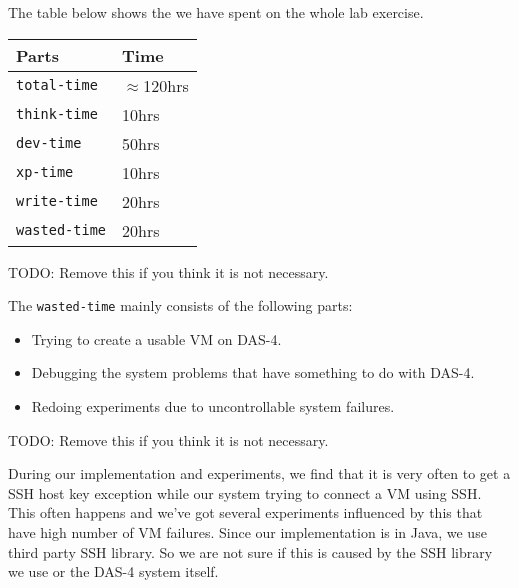 The table below shows the we have spent on the whole lab
exercise.

  \begin{center}
  \begin{tabular}{|l|l|}
    \hline
    Parts       & Time \\
    \hline
    \texttt{total-time}  & $\approx$120hrs \\
    \texttt{think-time}  & 10hrs \\
    \texttt{dev-time}    & 50hrs \\
    \texttt{xp-time}     & 10hrs \\
    \texttt{write-time}  & 20hrs \\
    \texttt{wasted-time} & 20hrs \\
    \hline
  \end{tabular}
  \end{center}

TODO: Remove this if you think it is not necessary.

The \texttt{wasted-time} mainly consists of the following parts:

\begin{itemize}
\item Trying to create a usable VM on DAS-4.
\item Debugging the system problems that have something to do with DAS-4.
\item Redoing experiments due to uncontrollable system failures.
\end{itemize}


\appendix[Feedbacks]
TODO: Remove this if you think it is not necessary.

During our implementation and experiments, we find that it is very often to
get a SSH host key exception while our system trying to connect a VM using
SSH. This often happens and we've got several experiments influenced by this
that have high number of VM failures. Since our implementation is in Java,
we use third party SSH library. So we are not sure if this is caused by
the SSH library we use or the DAS-4 system itself.


